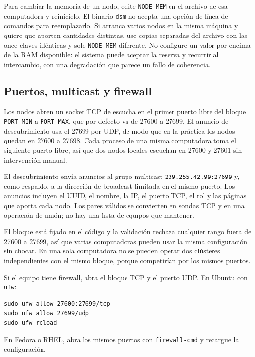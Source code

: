 Para cambiar la memoria de un nodo, edite \texttt{NODE\_MEM} en el archivo de esa computadora y reinícielo. El binario \texttt{dsm} no acepta una opción de línea de comandos para reemplazarlo. Si arranca varios nodos en la misma máquina y quiere que aporten cantidades distintas, use copias separadas del archivo con las once claves idénticas y solo \texttt{NODE\_MEM} diferente. No configure un valor por encima de la RAM disponible: el sistema puede aceptar la reserva y recurrir al intercambio, con una degradación que parece un fallo de coherencia.

\subsection{Puertos, multicast y firewall}\label{subsec:puertos-firewall}

Los nodos abren un socket TCP de escucha en el primer puerto libre del bloque \texttt{PORT\_MIN} a \texttt{PORT\_MAX}, que por defecto va de 27600 a 27699. El anuncio de descubrimiento usa el 27699 por UDP, de modo que en la práctica los nodos quedan en 27600 a 27698. Cada proceso de una misma computadora toma el siguiente puerto libre, así que dos nodos locales escuchan en 27600 y 27601 sin intervención manual.

El descubrimiento envía anuncios al grupo multicast \texttt{239.255.42.99:27699} y, como respaldo, a la dirección de broadcast limitada en el mismo puerto. Los anuncios incluyen el UUID, el nombre, la IP, el puerto TCP, el rol y las páginas que aporta cada nodo. Los pares válidos se convierten en sondas TCP y en una operación de unión; no hay una lista de equipos que mantener.

El bloque está fijado en el código y la validación rechaza cualquier rango fuera de 27600 a 27699, así que varias computadoras pueden usar la misma configuración sin chocar. En una sola computadora no se pueden operar dos clústeres independientes con el mismo bloque, porque competirían por los mismos puertos.

Si el equipo tiene firewall, abra el bloque TCP y el puerto UDP. En Ubuntu con \texttt{ufw}:

\begin{lstlisting}
sudo ufw allow 27600:27699/tcp
sudo ufw allow 27699/udp
sudo ufw reload
\end{lstlisting}

En Fedora o RHEL, abra los mismos puertos con \texttt{firewall-cmd} y recargue la configuración.

